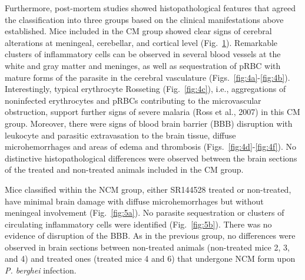 \documentclass[empirical, authordate, issue]{jote-new-article}
\begin{document}
\begin{figure}[t]
\begin{fullwidth}
{    }
    \caption{}
    \label{fig:4}
  \end{fullwidth}
\end{figure}

Furthermore, post-mortem studies showed histopathological features that agreed the classification into three groups based on the clinical manifestations above established. Mice included in the CM group showed clear signs of cerebral alterations at meningeal, cerebellar, and cortical level (Fig.~\ref{fig:4}). Remarkable clusters of inflammatory cells can be observed in several blood vessels at the white and gray matter and meninges, as well as sequestration of pRBC with mature forms of the parasite in the cerebral vasculature (Figs.~\ref{fig:4a}-\ref{fig:4b}). Interestingly, typical erythrocyte Rosseting (Fig.~\ref{fig:4c}), i.e., aggregations of noninfected erythrocytes and pRBCs contributing to the microvascular obstruction, support further signs of severe malaria (Ross et al., 2007) in this CM group. Moreover, there were signs of blood brain barrier (BBB) disruption with leukocyte and parasitic extravasation to the brain tissue, diffuse microhemorrhages and areas of edema and thrombosis (Figs.~\ref{fig:4d}-\ref{fig:4f}). No distinctive histopathological differences were observed between the brain sections of the treated and non-treated animals included in the CM group.

Mice classified within the NCM group, either SR144528 treated or non-treated, have minimal brain damage with diffuse microhemorrhages but without meningeal involvement (Fig.~\ref{fig:5a}). No parasite sequestration or clusters of circulating inflammatory cells were identified (Fig.~\ref{fig:5b}). There was no evidence of disruption of the BBB. As in the previous group, no differences were observed in brain sections between non-treated animals (non-treated mice 2, 3, and 4) and treated ones (treated mice 4 and 6) that undergone NCM form upon \emph{P. berghei} infection.
\end{document}
